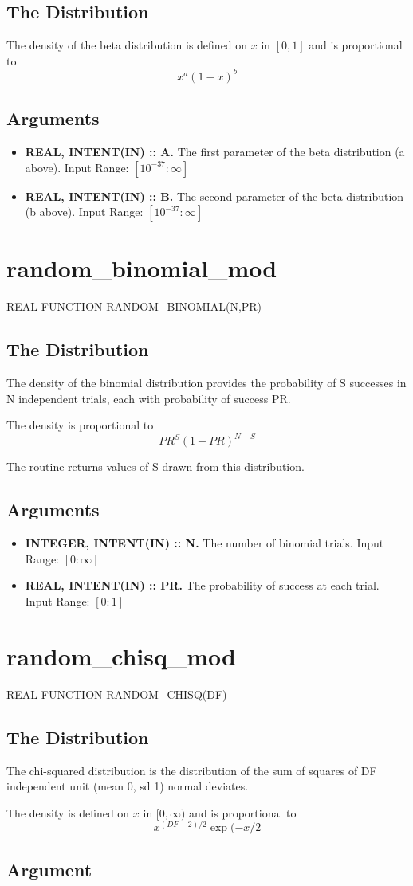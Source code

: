 \documentclass[12pt,dvips]{article}
\newcommand{\mysection}[1]{\color{blue}
            \section{#1} \normalcolor}
\newcommand{\mysubsection}[1] {\color{green}
            \subsection{#1} \normalcolor}
\newcommand{\myitem}[1]{\item{\bf \color{Violet} #1 \normalcolor}}
\newcommand{\inrange}[2]{\hfill Input Range: \ensuremath{\left[ #1:#2
\right]}\\}
\newcommand{\rtiny}{10^{-37}}
\begin{document}
\mysubsection{The Distribution}

The density of the beta distribution is defined on $x$ in $[0,1]$ and
is proportional to
\[ x^a (1-x)^b \]

\mysubsection{Arguments}

\begin{itemize}

\myitem{REAL, INTENT(IN) :: A.} The first parameter of the beta
  distribution (a above).
\inrange{\rtiny}{\infty}

\myitem{REAL, INTENT(IN) :: B.} The second parameter of the beta
  distribution (b above).
\inrange{\rtiny}{\infty}

\end{itemize}

\pagebreak

\mysection{random\_binomial\_mod}

      REAL FUNCTION RANDOM\_BINOMIAL(N,PR)

\mysubsection{The Distribution}

The density of the binomial distribution provides the probability of S
successes in N independent trials, each with probability of success
PR.

The density is proportional to
\[ PR^S (1-PR)^{N-S} \]

The routine returns values of S drawn from this distribution.

\mysubsection{Arguments}

\begin{itemize}

\myitem{INTEGER, INTENT(IN) :: N.}  The number of binomial trials.
\inrange{0}{\infty}


\myitem{REAL, INTENT(IN) :: PR.}  The probability of success at each
  trial.
\inrange{0}{1}

\end{itemize}

\pagebreak

\mysection{random\_chisq\_mod}

      REAL FUNCTION RANDOM\_CHISQ(DF)

\mysubsection{The Distribution}

The chi-squared distribution is the  distribution of the sum of squares
of DF independent unit (mean 0, sd 1) normal deviates.

The density  is defined on $x$ in $[0,\infty)$ and
is proportional to
\[ x^{(DF-2)/2} \exp(-x/2 \]

\mysubsection{Argument}
\end{document}
